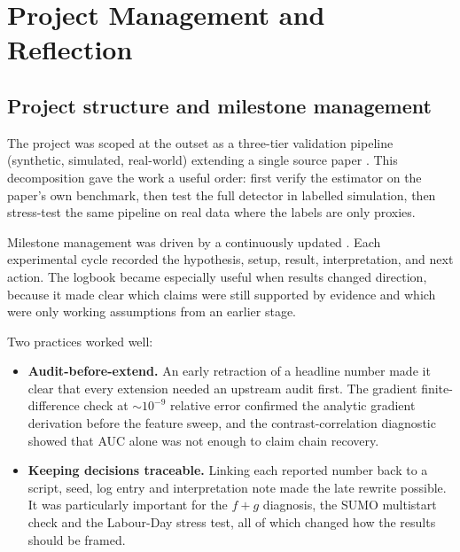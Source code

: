 \section{Project Management and Reflection}\label{sec:reflection}

\subsection{Project structure and milestone management}
\label{sec:reflect-pm}

The project was scoped at the outset as a three-tier validation
pipeline (synthetic, simulated, real-world) extending a single source
paper \cite{morimura2013}. This decomposition gave the work a useful
order: first verify the estimator on the paper's own benchmark, then test
the full detector in labelled simulation, then stress-test the same
pipeline on real data where the labels are only proxies.

Milestone management was driven by a continuously updated
. Each experimental cycle recorded the
hypothesis, setup, result, interpretation, and next action. The logbook
became especially useful when results changed direction, because it made
clear which claims were still supported by evidence and which were only
working assumptions from an earlier stage.

Two practices worked well:
\begin{itemize}
\item \textbf{Audit-before-extend.} An early retraction of a headline
number made it clear that every extension needed an upstream audit first.
The gradient finite-difference check at $\sim 10^{-9}$ relative error
confirmed the analytic gradient derivation before the feature sweep, and
the contrast-correlation diagnostic showed that AUC alone was not enough
to claim chain recovery.
\item \textbf{Keeping decisions traceable.} Linking each reported number
back to a script, seed, log entry and interpretation note made the late
rewrite possible. It was particularly important for the $f+g$ diagnosis,
the SUMO multistart check and the Labour-Day stress test, all of which
changed how the results should be framed.
\end{itemize}

